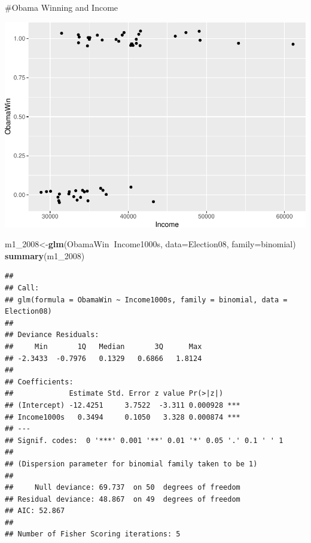 \documentclass[]{article}
\newenvironment{Shaded}{\begin{snugshade}}{\end{snugshade}}
\newcommand{\DataTypeTok}[1]{\textcolor[rgb]{0.13,0.29,0.53}{#1}}
\newcommand{\DecValTok}[1]{\textcolor[rgb]{0.00,0.00,0.81}{#1}}
\newcommand{\FloatTok}[1]{\textcolor[rgb]{0.00,0.00,0.81}{#1}}
\newcommand{\KeywordTok}[1]{\textcolor[rgb]{0.13,0.29,0.53}{\textbf{#1}}}
\newcommand{\NormalTok}[1]{#1}
\newcommand{\OperatorTok}[1]{\textcolor[rgb]{0.81,0.36,0.00}{\textbf{#1}}}
\newcommand{\StringTok}[1]{\textcolor[rgb]{0.31,0.60,0.02}{#1}}
\begin{document}
\#Obama Winning and Income

\begin{Shaded}
\end{Shaded}

\includegraphics{17-class-exercise_answers_files/figure-latex/unnamed-chunk-18-1.pdf}

\begin{Shaded}
\begin{Highlighting}[]
\NormalTok{m1_}\DecValTok{2008}\NormalTok{<-}\KeywordTok{glm}\NormalTok{(ObamaWin}\OperatorTok{~}\NormalTok{Income1000s, }\DataTypeTok{data=}\NormalTok{Election08, }\DataTypeTok{family=}\NormalTok{binomial)}
\KeywordTok{summary}\NormalTok{(m1_}\DecValTok{2008}\NormalTok{)}
\end{Highlighting}
\end{Shaded}

\begin{verbatim}
## 
## Call:
## glm(formula = ObamaWin ~ Income1000s, family = binomial, data = Election08)
## 
## Deviance Residuals: 
##     Min       1Q   Median       3Q      Max  
## -2.3433  -0.7976   0.1329   0.6866   1.8124  
## 
## Coefficients:
##             Estimate Std. Error z value Pr(>|z|)    
## (Intercept) -12.4251     3.7522  -3.311 0.000928 ***
## Income1000s   0.3494     0.1050   3.328 0.000874 ***
## ---
## Signif. codes:  0 '***' 0.001 '**' 0.01 '*' 0.05 '.' 0.1 ' ' 1
## 
## (Dispersion parameter for binomial family taken to be 1)
## 
##     Null deviance: 69.737  on 50  degrees of freedom
## Residual deviance: 48.867  on 49  degrees of freedom
## AIC: 52.867
## 
## Number of Fisher Scoring iterations: 5
\end{verbatim}
\end{document}
